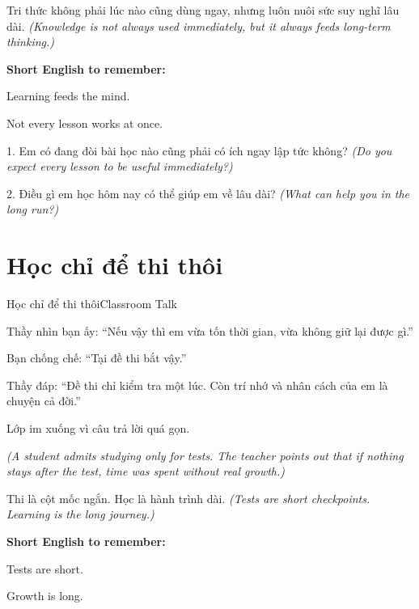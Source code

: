 \begin{baihoc}
Tri thức không phải lúc nào cũng dùng ngay, nhưng luôn nuôi sức suy nghĩ lâu dài.
\textit{(Knowledge is not always used immediately, but it always feeds long-term thinking.)}
\end{baihoc}

\begin{ghinhoanh}
\textbf{Short English to remember:}

Learning feeds the mind.

Not every lesson works at once.
\end{ghinhoanh}

\begin{tuhocnhanh}
1. Em có đang đòi bài học nào cũng phải có ích ngay lập tức không? \textit{(Do you expect every lesson to be useful immediately?)}

2. Điều gì em học hôm nay có thể giúp em về lâu dài? \textit{(What can help you in the long run?)}
\end{tuhocnhanh}
\ngancach

\section{Học chỉ để thi thôi}
\begin{truyen}{Học chỉ để thi thôi}{Classroom Talk}

Thầy nhìn bạn ấy: ``Nếu vậy thì em vừa tốn thời gian, vừa không giữ lại được gì.''

Bạn chống chế: ``Tại đề thi bắt vậy.''

Thầy đáp: ``Đề thi chỉ kiểm tra một lúc. Còn trí nhớ và nhân cách của em là chuyện cả đời.''

Lớp im xuống vì câu trả lời quá gọn.

\textit{(A student admits studying only for tests. The teacher points out that if nothing stays after the test, time was spent without real growth.)}
\end{truyen}

\begin{baihoc}
Thi là cột mốc ngắn. Học là hành trình dài.
\textit{(Tests are short checkpoints. Learning is the long journey.)}
\end{baihoc}

\begin{ghinhoanh}
\textbf{Short English to remember:}

Tests are short.

Growth is long.
\end{ghinhoanh}

